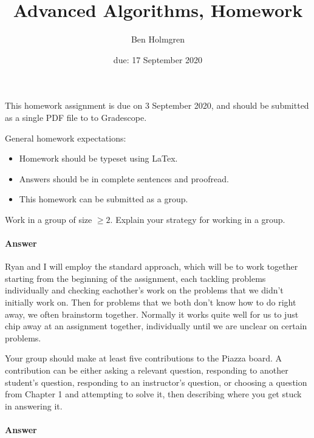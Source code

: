 \documentclass{article}
\title{Advanced Algorithms, Homework \hwnum}
\author{Ben Holmgren}
\date{due: 17 September 2020}
\begin{document}
\maketitle

This homework assignment is due on 3 September 2020, and should be
submitted as a single PDF file to to Gradescope.

General homework expectations:
\begin{itemize}
    \item Homework should be typeset using LaTex.
    \item Answers should be in complete sentences and proofread.
    \item This homework can be submitted as a group.
\end{itemize}

\nextprob
{}

Work in a group of size $\geq 2$.  Explain your strategy for working in a group.

\paragraph{Answer}


Ryan and I will employ the standard approach, which will be to work together
starting from the beginning of the assignment, each tackling problems individually and
checking eachother's work on the problems that we didn't initially work on. Then for problems
that we both don't know how to do right away, we often brainstorm together. Normally it works
quite well for us to just chip away at an assignment together, individually until we are unclear on
certain problems.


\nextprob
{}

Your group should make at least five contributions to the Piazza board.  A
contribution can be either asking a relevant question, responding to another
student's question, responding to an instructor's question, or choosing a
question from Chapter 1 and attempting to solve it, then  describing where you
get stuck in answering it.

\paragraph{Answer}
\end{document}

